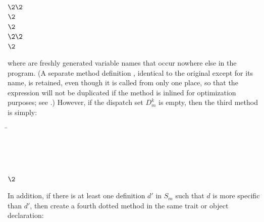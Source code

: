 \begin{codeexamplesize}
\begin{tabbing}
\(\2\2\) \\
\(\2\)\EXP{\ldots} \\
\(\2\) \\
\(\2\2\) \\
\(\2\) \\[6pt]
\end{tabbing}
\end{codeexamplesize}
where  are freshly generated variable names
that occur nowhere else in the program.  (A separate method definition , identical to the original except for its name,
is retained, even though it is called from only one place,
so that the expression  will not be duplicated if the method  is inlined
for optimization purposes; see .)
However, if the dispatch set $D_m^k$ is empty, then the third method is simply:
\begin{codeexamplesize}
\begin{tabbing}
\= \\
\>                   \\
\>                   \\
\>                  \EXP{\ldots,} \\
\>                   \\
\(\2\)
\end{tabbing}
\end{codeexamplesize}
In addition, if there is at least one definition $d'$ in $S_m$ such that $d$ is more specific than $d'$,
then create a fourth dotted method in the same trait or object declaration:
